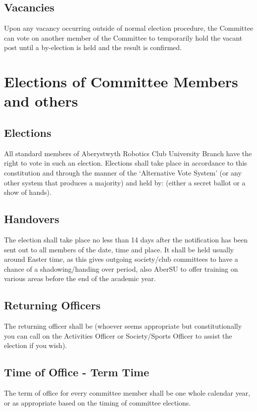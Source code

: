 \documentclass[a4paper,11pt]{article}
\begin{document}
\subsection{Vacancies}
Upon any vacancy occurring outside of normal election procedure, the Committee can vote on another member of the Committee to temporarily hold the vacant post until a by-election is held and the result is confirmed.

\newpage
\section{Elections of Committee Members and others}
\subsection{Elections}
All standard members of Aberystwyth Robotics Club University Branch have the right to vote in such an election. Elections shall take place in accordance to this constitution and through the manner of the `Alternative Vote System' (or any other system that produces a majority) and held by: (either a secret ballot or a show of hands).

\subsection{Handovers}
The election shall take place no less than 14 days after the notification has been sent out to all members of the date, time and place. It shall be held usually around Easter time, as this gives outgoing society/club committees to have a chance of a shadowing/handing over period, also AberSU to offer training on various areas before the end of the academic year.

\subsection{Returning Officers}
The returning officer shall be (whoever seems appropriate but constitutionally you can call on the Activities Officer or Society/Sports Officer to assist the election if you wish).

\subsection{Time of Office - Term Time}
The term of office for every committee member shall be one whole calendar year, or as appropriate based on the timing of committee elections.
\end{document}
